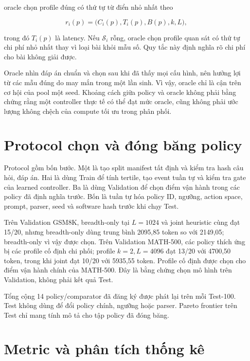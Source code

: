 oracle chọn profile đúng có thứ tự từ điển nhỏ nhất theo

\begin{equation}
  r_i(p)=\big(C_i(p),T_i(p),B(p),k,L\big),
\end{equation}

trong đó $T_i(p)$ là latency. Nếu $\mathcal{S}_i$ rỗng, oracle chọn profile quan sát
có thứ tự chi phí nhỏ nhất thay vì loại bài khỏi mẫu số. Quy tắc này định nghĩa rõ chi
phí cho bài không giải được.

Oracle nhìn đáp án chuẩn và chọn sau khi đã thấy mọi cấu hình, nên hưởng lợi từ các
mẫu đúng do may mắn trong một lần sinh. Vì vậy, oracle chỉ là cận trên cơ hội của pool
một seed. Khoảng cách giữa policy và oracle không phải bằng chứng rằng một controller
thực tế có thể đạt mức oracle, cũng không phải ước lượng không chệch của compute tối
ưu trong phân phối.

\section{Protocol chọn và đóng băng policy}

Protocol gồm bốn bước. Một là tạo split manifest tất định và kiểm tra hash câu hỏi,
đáp án. Hai là dùng Train để tính tertile, tạo event tuần tự và kiểm tra gate của
learned controller. Ba là dùng Validation để chọn điểm vận hành trong các policy đã
định nghĩa trước. Bốn là tuần tự hóa policy ID, ngưỡng, action space, prompt, parser,
seed và software hash trước khi chạy Test.

Trên Validation GSM8K, breadth-only tại $L=1024$ và joint heuristic cùng đạt 15/20,
nhưng breadth-only dùng trung bình 2095,85 token so với 2149,05; breadth-only vì vậy
được chọn. Trên Validation MATH-500, các policy thích ứng bị các profile cố định chi
phối; profile $k=2,L=4096$ đạt 13/20 với 4700,50 token, trong khi joint đạt 10/20 với
5935,55 token. Profile cố định được chọn cho điểm vận hành chính của MATH-500. Đây là
bằng chứng chọn mô hình trên Validation, không phải kết quả Test.

Tổng cộng 14 policy/comparator đã đăng ký được phát lại trên mỗi Test-100. Test không
dùng để đổi policy chính, ngưỡng hoặc parser. Pareto frontier trên Test chỉ mang tính
mô tả cho tập policy đã đóng băng.

\section{Metric và phân tích thống kê}

